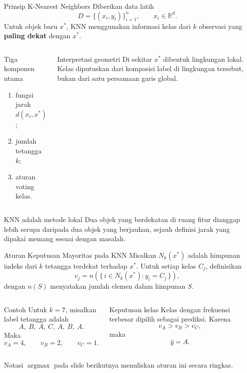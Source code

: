 \documentclass[aspectratio=169,11pt]{beamer}
\begin{document}
\begin{frame}{Prinsip K-Nearest Neighbors}
\small
Diberikan data latih
\[
D=\{(x_i,y_i)\}_{i=1}^{n},\qquad x_i\in\mathbb{R}^{d}.
\]
Untuk objek baru $x^*$, KNN menggunakan informasi kelas dari $k$ observasi yang \textbf{paling dekat} dengan $x^*$.
\begin{columns}[T]
\begin{block}{Tiga komponen utama}
\begin{enumerate}\small
  \item fungsi jarak $d(x_i,x^*)$;
  \item jumlah tetangga $k$;
  \item aturan voting kelas.
\end{enumerate}
\end{block}
\begin{block}{Interpretasi geometri}
\small
Di sekitar $x^*$ dibentuk lingkungan lokal. Kelas diputuskan dari komposisi label di lingkungan tersebut, bukan dari satu persamaan garis global.
\end{block}
\end{columns}
\begin{alertblock}{KNN adalah metode lokal}
\small
Dua objek yang berdekatan di ruang fitur dianggap lebih serupa daripada dua objek yang berjauhan, sejauh definisi jarak yang dipakai memang sesuai dengan masalah.
\end{alertblock}
\end{frame}

\begin{frame}{Aturan Keputusan Mayoritas pada KNN}
\small
Misalkan $N_k(x^*)$ adalah himpunan indeks dari $k$ tetangga terdekat terhadap $x^*$.
Untuk setiap kelas $C_j$, definisikan
\[
v_j=n\left(\{\,i\in N_k(x^*):y_i=C_j\,\}\right),
\]
dengan $n(S)$ menyatakan jumlah elemen dalam himpunan $S$.

\begin{columns}[T]
\begin{block}{Contoh}
Untuk $k=7$, misalkan label tetangga adalah
\[
A,\ B,\ A,\ C,\ A,\ B,\ A.
\]
Maka
\[
v_A=4,\qquad v_B=2,\qquad v_C=1.
\]
\end{block}

\begin{block}{Keputusan kelas}
Kelas dengan frekuensi terbesar dipilih sebagai prediksi.
Karena
\[
v_A>v_B>v_C,
\]
maka
\[
\hat y=A.
\]
\end{block}
\end{columns}

\vspace{1mm}
\footnotesize
Notasi $\operatorname{argmax}$ pada slide berikutnya menuliskan aturan ini secara ringkas.
\end{frame}
\end{document}
